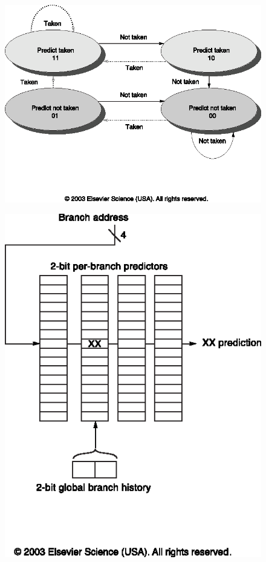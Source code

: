 \begin{slide}
\begin{figure}
\begin{center}
\includegraphics*[scale=0.95]{Ch3-fig07}
\end{center}
\end{figure}
\end{slide}

\begin{slide}
\begin{figure}
\begin{center}
\includegraphics*[scale=0.85]{Ch3-fig14}
\end{center}
\end{figure}
\end{slide}
